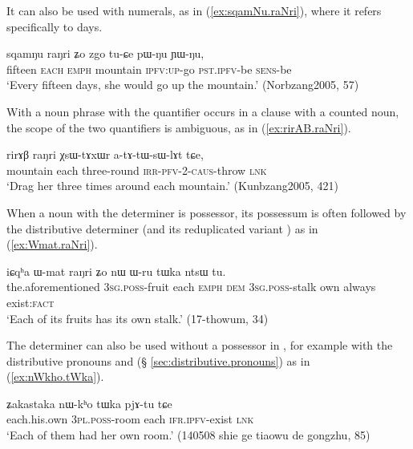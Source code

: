  It can also be used with numerals, as in (\ref{ex:sqamNu.raNri}), where it refers specifically to days.

 \begin{exe}
\ex \label{ex:sqamNu.raNri}
\gll  sqamŋu raŋri ʑo zgo tu-ɕe pɯ-ŋu ɲɯ-ŋu, \\
fifteen \textsc{each} \textsc{emph} mountain \textsc{ipfv}:\textsc{up}-go \textsc{pst}.\textsc{ipfv}-be \textsc{sens}-be \\
\glt `Every fifteen days, she would go up the mountain.' (Norbzang2005, 57)
  \end{exe}

With a noun phrase with the quantifier  occurs in a clause with a counted noun, the scope of the two quantifiers is ambiguous, as in (\ref{ex:rirAB.raNri}).

\begin{exe}
\ex \label{ex:rirAB.raNri}
\gll rirɤβ raŋri χsɯ-tɤxɯr a-tɤ-tɯ-sɯ-lɤt tɕe, \\
mountain each three-round \textsc{irr}-\textsc{pfv}-2-\textsc{caus}-throw \textsc{lnk} \\
\glt `Drag her three times around each mountain.' (Kunbzang2005, 421)
 \end{exe}
 
When a noun with the determiner  is possessor, its possessum is often  followed by the distributive determiner  (and its reduplicated variant ) as in (\ref{ex:Wmat.raNri}).
 
  \begin{exe}
\ex \label{ex:Wmat.raNri}
\gll   iɕqʰa ɯ-mat raŋri ʑo nɯ ɯ-ru tɯka ntsɯ tu. \\
the.aforementioned \textsc{3sg}.\textsc{poss}-fruit each \textsc{emph} \textsc{dem} \textsc{3sg}.\textsc{poss}-stalk own always exist:\textsc{fact} \\
\glt `Each of its fruits has its own stalk.' (17-thowum, 34)
  \end{exe}
  
The  determiner  can also be used without a possessor in  , for example with the distributive pronouns  and  (§ \ref{sec:distributive.pronouns})  as in (\ref{ex:nWkho.tWka}).

   \begin{exe}
\ex \label{ex:nWkho.tWka}
\gll      ʑakastaka nɯ-kʰo tɯka pjɤ-tu tɕe \\
each.his.own \textsc{3pl}.\textsc{poss}-room each \textsc{ifr}.\textsc{ipfv}-exist \textsc{lnk} \\
\glt `Each of them had her own room.' (140508 shie ge tiaowu de gongzhu, 85)
   \end{exe}
   

